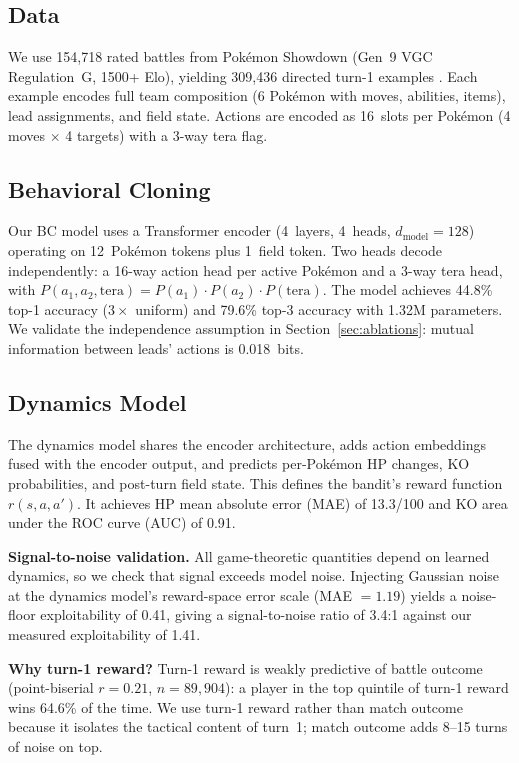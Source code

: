 \documentclass{article}
\begin{document}
\subsection{Data}

We use 154,718 rated battles from Pok\'emon Showdown (Gen~9 VGC Regulation~G, 1500+ Elo), yielding 309,436 directed turn-1 examples \citep{brennan2026turnzero}. Each example encodes full team composition (6 Pok\'emon with moves, abilities, items), lead assignments, and field state. Actions are encoded as 16~slots per Pok\'emon (4 moves $\times$ 4 targets) with a 3-way tera flag.

\subsection{Behavioral Cloning}

Our BC model uses a Transformer encoder (4~layers, 4~heads, $d_\text{model} = 128$) operating on 12~Pok\'emon tokens plus 1~field token. Two heads decode independently: a 16-way action head per active Pok\'emon and a 3-way tera head, with $P(a_1, a_2, \text{tera}) = P(a_1) \cdot P(a_2) \cdot P(\text{tera})$. The model achieves 44.8\% top-1 accuracy ($3\times$ uniform) and 79.6\% top-3 accuracy with 1.32M parameters. We validate the independence assumption in Section~\ref{sec:ablations}: mutual information between leads' actions is 0.018~bits.

\subsection{Dynamics Model}

The dynamics model shares the encoder architecture, adds action embeddings fused with the encoder output, and predicts per-Pok\'emon HP changes, KO probabilities, and post-turn field state. This defines the bandit's reward function $r(s,a,a')$. It achieves HP mean absolute error (MAE) of 13.3/100 and KO area under the ROC curve (AUC) of 0.91.

\textbf{Signal-to-noise validation.} All game-theoretic quantities depend on learned dynamics, so we check that signal exceeds model noise. Injecting Gaussian noise at the dynamics model's reward-space error scale (MAE $= 1.19$) yields a noise-floor exploitability of 0.41, giving a signal-to-noise ratio of 3.4:1 against our measured exploitability of 1.41.

\textbf{Why turn-1 reward?} Turn-1 reward is weakly predictive of battle outcome (point-biserial $r = 0.21$, $n = 89{,}904$): a player in the top quintile of turn-1 reward wins 64.6\% of the time. We use turn-1 reward rather than match outcome because it isolates the tactical content of turn~1; match outcome adds 8--15 turns of noise on top.
\end{document}
